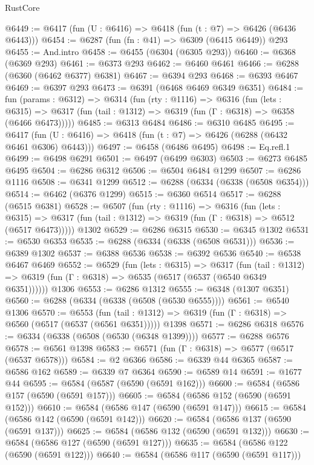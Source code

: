 \begin{lexlean}{RustCore}
\begin{coremodule}
@6449 := @6417 (fun (U : @6416) => @6418 (fun (t : @7) => @6426 (@6436 @6443)))
@6454 := @6287 (fun (fn : @41) => @6309 (@6415 @6449)) @293
@6455 := And.intro
@6458 := @6455 (@6304 (@6305 @293))
@6460 := @6368 (@6369 @293)
@6461 := @6373 @293
@6462 := @6460 @6461
@6466 := @6288 (@6360 (@6462 @6377) @6381)
@6467 := @6394 @293
@6468 := @6393 @6467
@6469 := @6397 @293
@6473 := @6391 (@6468 @6469 @6349 @6351)
@6484 := fun (params : @6312) =>
  @6314
    (fun (rty : @1116) =>
    @6316
      (fun (lets : @6315) =>
      @6317 (fun (tail : @1312) => @6319 (fun (Γ : @6318) => @6358 (@6466 @6473)))))
@6485 := @6313 @6484
@6486 := @6310 @6485
@6495 := @6417 (fun (U : @6416) => @6418 (fun (t : @7) => @6426 (@6288 (@6432 @6461 @6306) @6443)))
@6497 := @6458 (@6486 @6495)
@6498 := Eq.refl.{1}
@6499 := @6498 @6291
@6501 := @6497 (@6499 @6303)
@6503 := @6273 @6485 @6495
@6504 := @6286 @6312
@6506 := @6504 @6484 @1299
@6507 := @6286 @1116
@6508 := @6341 @1299
@6512 := @6288 (@6334 (@6338 (@6508 @6354)))
@6514 := @6462 (@6376 @1299)
@6515 := @6360 @6514
@6517 := @6288 (@6515 @6381)
@6528 := @6507
    (fun (rty : @1116) =>
    @6316
      (fun (lets : @6315) =>
      @6317 (fun (tail : @1312) => @6319 (fun (Γ : @6318) => @6512 (@6517 @6473)))))
    @1302
@6529 := @6286 @6315
@6530 := @6345 @1302
@6531 := @6530 @6353
@6535 := @6288 (@6334 (@6338 (@6508 @6531)))
@6536 := @6389 @1302
@6537 := @6388 @6536
@6538 := @6392 @6536
@6540 := @6538 @6467 @6469
@6552 := @6529
    (fun (lets : @6315) =>
    @6317
      (fun (tail : @1312) => @6319 (fun (Γ : @6318) => @6535 (@6517 (@6537 (@6540 @6349 @6351))))))
    @1306
@6553 := @6286 @1312
@6555 := @6348 (@1307 @6351)
@6560 := @6288 (@6334 (@6338 (@6508 (@6530 @6555))))
@6561 := @6540 @1306
@6570 := @6553
    (fun (tail : @1312) => @6319 (fun (Γ : @6318) => @6560 (@6517 (@6537 (@6561 @6351)))))
    @1398
@6571 := @6286 @6318
@6576 := @6334 (@6338 (@6508 (@6530 (@6348 @1399))))
@6577 := @6288 @6576
@6578 := @6561 @1398
@6583 := @6571 (fun (Γ : @6318) => @6577 (@6517 (@6537 @6578)))
@6584 := @2 @6366
@6586 := @6339 @44 @6365
@6587 := @6586 @162
@6589 := @6339 @7 @6364
@6590 := @6589 @14
@6591 := @1677 @44
@6595 := @6584 (@6587 (@6590 (@6591 @162)))
@6600 := @6584 (@6586 @157 (@6590 (@6591 @157)))
@6605 := @6584 (@6586 @152 (@6590 (@6591 @152)))
@6610 := @6584 (@6586 @147 (@6590 (@6591 @147)))
@6615 := @6584 (@6586 @142 (@6590 (@6591 @142)))
@6620 := @6584 (@6586 @137 (@6590 (@6591 @137)))
@6625 := @6584 (@6586 @132 (@6590 (@6591 @132)))
@6630 := @6584 (@6586 @127 (@6590 (@6591 @127)))
@6635 := @6584 (@6586 @122 (@6590 (@6591 @122)))
@6640 := @6584 (@6586 @117 (@6590 (@6591 @117)))

\end{coremodule}
\end{lexlean}

